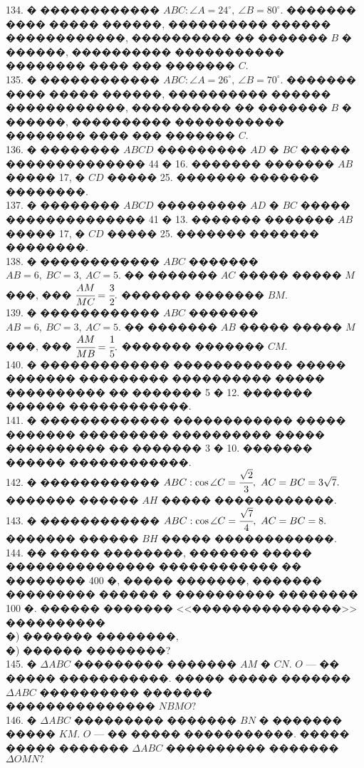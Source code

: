 \documentclass[12pt]{article}
\begin{document}
134. � ������������ $ABC: \angle A=24^\circ,\ \angle B=80^\circ.$ ������� ���� ����� ������, ���������� ������ ������������, ���������� �� ������� $B$ � ������, ���������� ����������� �������� ���� ��� ������� $C.$\\
135. � ������������ $ABC: \angle A=26^\circ,\ \angle B=70^\circ.$ ������� ���� ����� ������, ���������� ������ ������������, ���������� �� ������� $B$ � ������, ���������� ����������� �������� ���� ��� ������� $C.$\\
136. � �������� $ABCD$ ��������� $AD$ � $BC$ ����� �������������� 44 � 16. ������� ������� $AB$ ����� 17, � $CD$ ����� 25. ������� ������� ��������.\\
137. � �������� $ABCD$ ��������� $AD$ � $BC$ ����� �������������� 41 � 13. ������� ������� $AB$ ����� 17, � $CD$ ����� 25. ������� ������� ��������.\\
138. � ������������ $ABC$ ������� $AB=6,\ BC=3,\ AC=5.$ �� ������� $AC$ ����� ����� $M$ ���, ��� $\cfrac{AM}{MC}=\cfrac{3}{2}.$ ������� ������� $BM.$\\
139. � ������������ $ABC$ ������� $AB=6,\ BC=3,\ AC=5.$ �� ������� $AB$ ����� ����� $M$ ���, ��� $\cfrac{AM}{MB}=\cfrac{1}{5}.$ ������� ������� $CM.$\\
140. � ������������� ������������ ����� ������� ��������� ���������� ����� ���������� �� ������� 5 � 12. ������� ������ ������������.\\
141. � ������������� ������������ ����� ������� ��������� ���������� ����� ���������� �� ������� 3 � 10. ������� ������ ������������.\\
142. � ������������ $ABC: \cos \angle C=\cfrac{\sqrt{2}}{3},\ AC=BC=3\sqrt{7}.$ ������� ������ $AH$ ����� ������������.\\
143. � ������������ $ABC: \cos \angle C=\cfrac{\sqrt{7}}{4},\ AC=BC=8.$ ������� ������ $BH$ ����� ������������.\\
144. �� ����� ��������, ������� ����� ��������������� ������������ �� �������� 400 �, ����� �������, ������� ��������� ������ � ���������� �������� 100 �. ������ ������� <<���������������>> ����������\\
�) ������� ��������,\\
�) ������ ��������?\\
145. � $\Delta ABC$ ��������� ������� $AM$ � $CN.$
$O$ --- �� ����� �����������. ����� ����� ������� $\Delta ABC$ ���������� ������� ��������������� $NBMO?$\\
146. � $\Delta ABC$ ��������� ������� $BN$ � ������� ����� $KM.$ $O$ --- �� ����� �����������. ����� ����� ������� $\Delta ABC$ ���������� ������� $\Delta OMN?$\\
\end{document}
